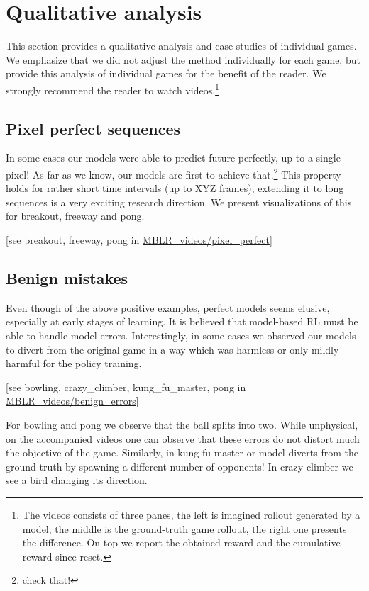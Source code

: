 \documentclass[12pt]{article}
\begin{document}
\maketitle

\section{Qualitative analysis}
This section provides a qualitative analysis and case studies of individual games. We emphasize that we did not adjust the method individually for each game, but provide this analysis of individual games for the benefit of the reader. We strongly recommend the reader to watch videos.\footnote{The videos consists of three panes, the left is imagined rollout generated by a model, the middle is the ground-truth game rollout, the right one presents the difference. On top we report the obtained reward and the cumulative reward since reset.}

\subsection{Pixel perfect sequences}
In some cases our models were able to predict future perfectly, up to a single pixel! As far as we know, our models are first to achieve that.\footnote{check that!} This property holds for rather short time intervals (up to XYZ frames), extending it to long sequences is a very exciting research direction. We present visualizations of this for breakout, freeway and pong.

[see breakout, freeway, pong in \href{https://drive.google.com/open?id=1tXbwvKjO1-rVWQ88UJE1plOpzypGVXr0}{MBLR\_videos/pixel\_perfect}]

\subsection{Benign mistakes}
Even though of the above positive examples, perfect models seems elusive, especially at early stages of learning. It is believed that model-based RL must be able to handle model errors. Interestingly, in some cases we observed our models to divert from the original game in a way which was harmless or only mildly harmful for the policy training. 

[see bowling, crazy\_climber, kung\_fu\_master, pong in \href{https://drive.google.com/open?id=1vQlJMlThZEvN6AmqSvhSA9NnMQFA3e5T}{MBLR\_videos/benign\_errors}]

For bowling and pong we observe that the ball splits into two. While unphysical, on the accompanied videos one can observe that these errors do not distort much the objective of the game. Similarly, in kung fu master or model diverts from the ground truth by spawning a different number of opponents! In crazy climber we see a bird changing its direction.
\end{document}
